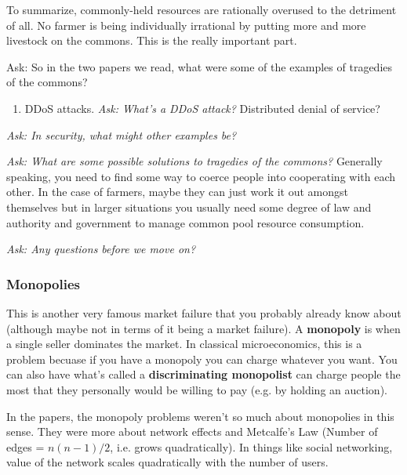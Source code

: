 \documentclass[11pt]{article}
\begin{document}
To summarize, commonly-held resources are rationally overused to the detriment of all. No farmer is being individually irrational by putting more and more livestock on the commons. This is the really important part. 



{Ask: So in the two papers we read, what were some of the examples of tragedies of the commons?}
\begin{enumerate}
    \item DDoS attacks. {\it Ask: What's a DDoS attack?} Distributed denial of service?
\end{enumerate}

{\it Ask: In security, what might other examples be?}

{\it Ask: What are some possible solutions to tragedies of the commons?} Generally speaking, you need to find some way to coerce people into cooperating with each other. In the case of farmers, maybe they can just work it out amongst themselves but in larger situations you usually need some degree of law and authority and government to manage common pool resource consumption.

{\it Ask: Any questions before we move on?}

\subsubsection{Monopolies}

This is another very famous market failure that you probably already know about (although maybe not in terms of it being a market failure). A {\bf monopoly} is when a single seller dominates the market. In classical microeconomics, this is a problem becuase if you have a monopoly you can charge whatever you want. You can also have what's called a {\bf discriminating monopolist} can charge people the most that they personally would be willing to pay (e.g. by holding an auction). 

In the papers, the monopoly problems weren't so much about monopolies in this sense. They were more about network effects and Metcalfe's Law (Number of edges = $n(n-1)/2$, i.e. grows quadratically). In things like social networking, value of the network scales quadratically with the number of users.
\end{document}
